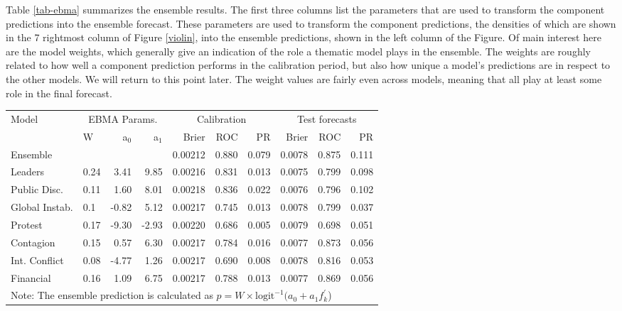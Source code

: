 \documentclass[pdftex,11pt]{article}
\begin{document}
Table \ref{tab-ebma} summarizes the ensemble results. The first three columns list the parameters that are used to transform the component predictions into the ensemble forecast. These parameters are used to transform the component predictions, the densities of which are shown in the 7 rightmost column of Figure \ref{violin}, into the ensemble predictions, shown in the left column of the Figure. Of main interest here are the model weights, which generally give an indication of the role a thematic model plays in the ensemble. The weights are roughly related to how well a component prediction performs in the calibration period, but also how unique a model's predictions are in respect to the other models. We will return to this point later. The weight values are fairly even across models, meaning that all play at least some role in the final forecast. 

\begin{table*}[ht]
\caption{Ensemble and individual models of ILCs}
\label{tab-ebma}
\centering
\begin{tabular}{llrrrrrrrr}
  \toprule
Model & \multicolumn{3}{c}{EBMA Params.} & \multicolumn{3}{c}{Calibration} & \multicolumn{3}{c}{Test forecasts} \\
  & W & a$_0$ & a$_1$ & Brier & ROC & PR & Brier & ROC & PR \\ 
  \midrule
Ensemble &  &  &  & 0.00212 & 0.880 & 0.079 & 0.0078 & 0.875 & 0.111 \\ 
  Leaders & 0.24 & 3.41 & 9.85 & 0.00216 & 0.831 & 0.013 & 0.0075 & 0.799 & 0.098 \\ 
  Public Disc. & 0.11 & 1.60 & 8.01 & 0.00218 & 0.836 & 0.022 & 0.0076 & 0.796 & 0.102 \\ 
  Global Instab. & 0.1 & -0.82 & 5.12 & 0.00217 & 0.745 & 0.013 & 0.0078 & 0.799 & 0.037 \\ 
  Protest & 0.17 & -9.30 & -2.93 & 0.00220 & 0.686 & 0.005 & 0.0079 & 0.698 & 0.051 \\ 
  Contagion & 0.15 & 0.57 & 6.30 & 0.00217 & 0.784 & 0.016 & 0.0077 & 0.873 & 0.056 \\ 
  Int. Conflict & 0.08 & -4.77 & 1.26 & 0.00217 & 0.690 & 0.008 & 0.0078 & 0.816 & 0.053 \\ 
  Financial & 0.16 & 1.09 & 6.75 & 0.00217 & 0.788 & 0.013 & 0.0077 & 0.869 & 0.056 \\    
  \bottomrule
\multicolumn{10}{p{5in}}{Note: The ensemble prediction is calculated as $p = W \times \textrm{logit}^{-1}(a_0 + a_1 f_k^\prime$)}
\end{tabular}
\end{table*}
\end{document}
